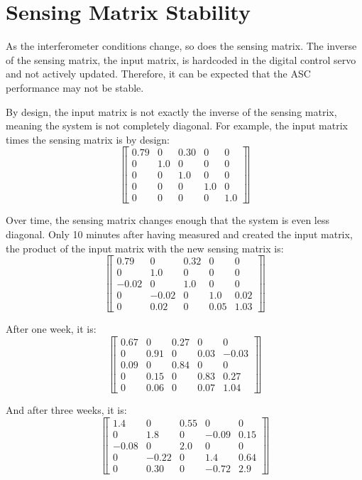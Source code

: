 \section{Sensing Matrix Stability}

As the interferometer conditions change, so does the sensing
matrix. The inverse of the sensing matrix, the input matrix, is
hardcoded in the digital control servo and not actively
updated. Therefore, it can be expected that the ASC performance may
not be stable. 

By design, the input matrix is not exactly the inverse of the sensing
matrix, meaning the system is not completely diagonal. For example,
the input matrix times the sensing matrix is by design:
 \[ \left\llbracket \begin{array}{ccccc}
0.79 & 0 & 0.30 & 0 & 0 \\
0 & 1.0 & 0 & 0 & 0 \\
0 & 0 & 1.0 & 0 & 0 \\
0 & 0 & 0 & 1.0 & 0 \\
0 & 0 & 0 & 0 & 1.0 
\end{array} \right\rrbracket\] 

Over time, the sensing matrix changes enough that the system is even less 
diagonal. Only 10 minutes after having measured and created the input
matrix, the product of the input matrix with the new sensing matrix is:
\[ \left\llbracket \begin{array}{ccccc}
0.79 & 0 & 0.32 & 0 & 0 \\
0 & 1.0 & 0 & 0 & 0 \\
-0.02 & 0 & 1.0 & 0 & 0 \\
0 & -0.02 & 0 & 1.0 & 0.02 \\
0 & 0.02 & 0 & 0.05 & 1.03 
\end{array} \right\rrbracket\] 

After one week, it is:
 \[ \left\llbracket \begin{array}{ccccc}
0.67 & 0 & 0.27 & 0 & 0 \\
0 & 0.91 & 0 & 0.03 & -0.03 \\
0.09 & 0 & 0.84 & 0 & 0 \\
0 & 0.15 & 0 & 0.83 & 0.27 \\
0 & 0.06 & 0 & 0.07 & 1.04 
\end{array} \right\rrbracket\] 

And after three weeks, it is:
 \[ \left\llbracket \begin{array}{ccccc}
1.4 & 0 & 0.55 & 0 & 0 \\
0 & 1.8 & 0 & -0.09 & 0.15 \\
-0.08 & 0 & 2.0 & 0 & 0 \\
0 & -0.22 & 0 & 1.4 & 0.64 \\
0 & 0.30 & 0 & -0.72 & 2.9 
\end{array} \right\rrbracket\] 





